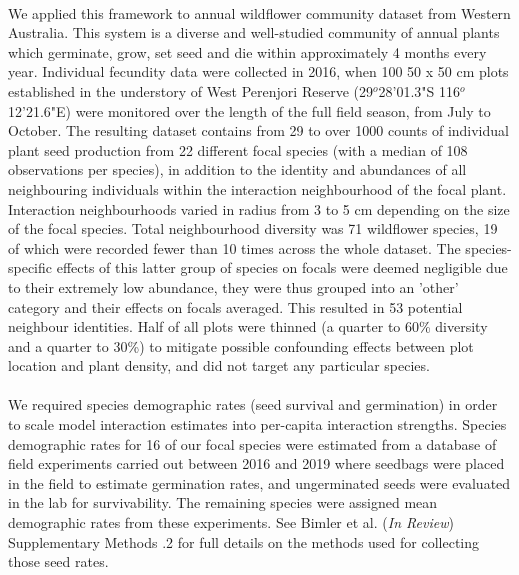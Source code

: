 \documentclass[a4,12pt]{article}
\begin{document}
        \paragraph{}
        We applied this framework to annual wildflower community dataset from Western Australia. This system is a diverse and well-studied community of annual plants which germinate, grow, set seed and die within approximately 4 months every year. Individual fecundity data were collected in 2016, when 100 50 x 50 cm plots established in the understory of West Perenjori Reserve (29$^o$28'01.3"S 116$^o$12'21.6"E) were monitored over the length of the full field season, from July to October. The resulting dataset contains from 29 to over 1000 counts of individual plant seed production from 22 different focal species (with a median of 108 observations per species), in addition to the identity and abundances of all neighbouring individuals within the interaction neighbourhood of the focal plant. Interaction neighbourhoods varied in radius from 3 to 5 cm depending on the size of the focal species. Total neighbourhood diversity was 71 wildflower species, 19 of which were recorded fewer than 10 times across the whole dataset. The species-specific effects of this latter group of species on focals were deemed negligible due to their extremely low abundance, they were thus grouped into an 'other' category and their effects on focals averaged. This resulted in 53 potential neighbour identities. Half of all plots were thinned (a quarter to 60\% diversity and a quarter to 30\%) to mitigate possible confounding effects between plot location and plant density, and did not target any particular species.

        \paragraph{} 
        We required species demographic rates (seed survival and germination) in order to scale model interaction estimates into per-capita interaction strengths. Species demographic rates for 16 of our focal species were estimated from a database of field experiments carried out between 2016 and 2019 where seedbags were placed in the field to estimate germination rates, and ungerminated seeds were evaluated in the lab for survivability.  The remaining species were assigned mean demographic rates from these experiments. See Bimler et al. (\textit{In Review}) Supplementary Methods .2 for full details on the methods used for collecting those seed rates.
\end{document}
